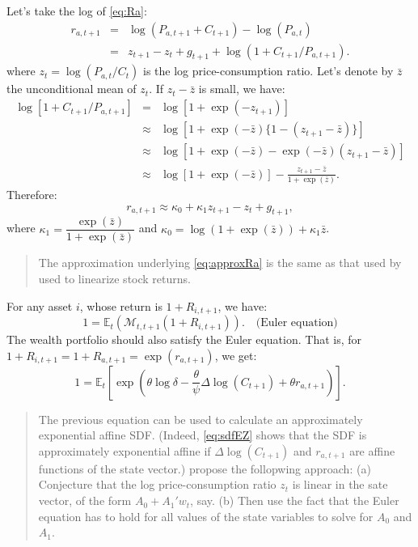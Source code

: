 \documentclass[
  12pt,
]{book}
\theoremstyle{definition}
\theoremstyle{definition}
\theoremstyle{definition}
\theoremstyle{definition}
\theoremstyle{remark}
\begin{document}
Let's take the log of \eqref{eq:Ra}:
\begin{eqnarray*}
r_{a,t+1} &=& \log(P_{a,t+1}+C_{t+1}) - \log(P_{a,t})\\
&=& z_{t+1} - z_t + g_{t+1} + \log(1 + C_{t+1} / P_{a,t+1}).
\end{eqnarray*}
where \(z_t = \log(P_{a,t}/C_t)\) is the log price-consumption ratio.
Let's denote by \(\bar{z}\) the unconditional mean of \(z_t\). If \(z_t - \bar{z}\) is small, we have:
\begin{eqnarray*}
\log[1 + C_{t+1} / P_{a,t+1}] &=& \log[1 + \exp(-z_{t+1})]\\
&\approx& \log[1 + \exp(-\bar{z})\{1 - (z_{t+1}- \bar{z})\}]\\
&\approx& \log[1 + \exp(-\bar{z}) - \exp(-\bar{z})(z_{t+1}- \bar{z})]\\
&\approx& \log[1 + \exp(-\bar{z})] - \frac{z_{t+1}- \bar{z}}{1 + \exp(\bar{z})}.
\end{eqnarray*}
Therefore:
\begin{equation}
\boxed{r_{a,t+1} \approx \kappa_0 + \kappa_1 z_{t+1} - z_t + g_{t+1},}\label{eq:approxRa}
\end{equation}
where \(\kappa_1= \dfrac{\exp(\bar{z})}{1 + \exp(\bar{z})}\) and \(\kappa_0 = \log(1 + \exp(\bar{z})) + \kappa_1 \bar{z}\).

\begin{quote}
The approximation underlying \eqref{eq:approxRa} is the same as that used by \citet{Campbell_Shiller_1988} used to linearize stock returns.
\end{quote}

For any asset \(i\), whose return is \(1+R_{i,t+1}\), we have:
\begin{equation}
1 = \mathbb{E}_t(\mathcal{M}_{t,t+1}(1+R_{i,t+1})). \quad \mbox{(Euler equation)}\label{eq:Euler}
\end{equation}
The wealth portfolio should also satisfy the Euler equation. That is, for \(1+R_{i,t+1} = 1+R_{a,t+1} = \exp(r_{a,t+1})\), we get:
\begin{equation}
1 = \mathbb{E}_t \left[ \exp\left(\theta \log \delta - \frac{\theta}{\psi} \Delta \log(C_{t+1}) + \theta r_{a,t+1} \right) \right].\label{eq:sdfRa}
\end{equation}

\begin{quote}
The previous equation can be used to calculate an approximately exponential affine SDF. (Indeed, \eqref{eq:sdfEZ} shows that the SDF is approximately exponential affine if \(\Delta \log(C_{t+1})\) and \(r_{a,t+1}\) are affine functions of the state vector.) \citet{Bansal_Yaron_2004} propose the follopwing approach: (a) Conjecture that the log price-consumption ratio \(z_t\) is linear in the sate vector, of the form \(A_0 + A_1'w_t\), say. (b) Then use the fact that the Euler equation has to hold for all values of the state variables to solve for \(A_0\) and \(A_1\).
\end{quote}
\end{document}
